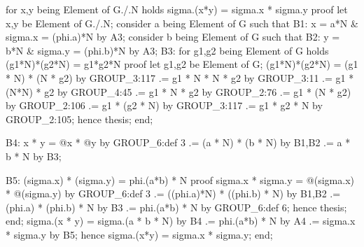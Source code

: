   for x,y being Element of G./.N holds sigma.(x*y) = sigma.x * sigma.y
  proof
    let x,y be Element of G./.N;
    consider a being Element of G such that
    B1: x = a*N & sigma.x = (phi.a)*N by A3;
    consider b being Element of G such that
    B2: y = b*N & sigma.y = (phi.b)*N by A3;
    B3: for g1,g2 being Element of G holds (g1*N)*(g2*N) = g1*g2*N
    proof
      let g1,g2 be Element of G;
      (g1*N)*(g2*N) = (g1 * N) * (N * g2) by GROUP_3:117
                   .= g1 * N * N * g2 by GROUP_3:11
                   .= g1 * (N*N) * g2 by GROUP_4:45
                   .= g1 * N * g2 by GROUP_2:76
                   .= g1 * (N * g2) by GROUP_2:106
                   .= g1 * (g2 * N) by GROUP_3:117
                   .= g1 * g2 * N by GROUP_2:105;
      hence thesis;
    end;

    B4: x * y = @x * @y by GROUP_6:def 3
             .= (a * N) * (b * N) by B1,B2
             .= a * b * N by B3;

    B5: (sigma.x) * (sigma.y) = phi.(a*b) * N
    proof
      sigma.x * sigma.y = @(sigma.x) * @(sigma.y) by GROUP_6:def 3
                       .= ((phi.a)*N) * ((phi.b) * N) by B1,B2
                       .= (phi.a) * (phi.b) * N by B3
                       .= phi.(a*b) * N by GROUP_6:def 6;
      hence thesis;
    end;
    sigma.(x * y) = sigma.(a * b * N) by B4
                 .= phi.(a*b) * N by A4
                 .= sigma.x * sigma.y by B5;
    hence sigma.(x*y) = sigma.x * sigma.y;
  end;

